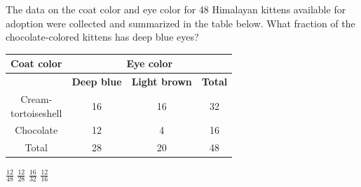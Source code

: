 \question[1]
The data on the coat color and eye color for 48 Himalayan kittens available for adoption were collected and summarized in the table below. What fraction of the chocolate-colored kittens has deep blue eyes?
\begin{center}
  \renewcommand{\arraystretch}{1.3}
  \setlength{\tabcolsep}{0.5em}
  \label{tab:sat-drill-07-himalayan-kittens}%
  \vspace{0.35em}
  \begin{adjustbox}{max width=\linewidth,clip=false,margin=0pt}
  \begin{tabular}{|c|c|c|c|}
    \hline
    \cellcolor[HTML]{E0E0E0}\textbf{Coat color} &
    \multicolumn{3}{|c|}{\cellcolor[HTML]{E0E0E0}\textbf{Eye color}} \\
    \hline
    \cellcolor[HTML]{E0E0E0}\mbox{} &
    \cellcolor[HTML]{E0E0E0}\textbf{Deep blue} &
    \cellcolor[HTML]{E0E0E0}\textbf{Light brown} &
    \cellcolor[HTML]{E0E0E0}\textbf{Total} \\
    \hline
    \makecell{Cream-\\{}tortoiseshell} & 16 & 16 & 32 \\
    \hline
    Chocolate & 12 & 4 & 16 \\
    \hline
    Total & 28 & 20 & 48 \\
    \hline
  \end{tabular}
  \end{adjustbox}
\end{center}
\begin{choices}
  \choice $\frac{12}{48}$
  \choice $\frac{12}{28}$
  \choice $\frac{16}{32}$
  \CorrectChoice $\frac{12}{16}$
\end{choices}


\newpage

